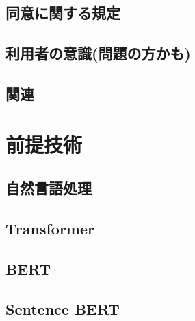 \subsection{同意に関する規定}

\subsection{利用者の意識(問題の方かも)}

\subsection{関連}

\section{前提技術}

\subsection{自然言語処理}

\subsection{Transformer}

\subsection{BERT}

\subsection{Sentence BERT}



